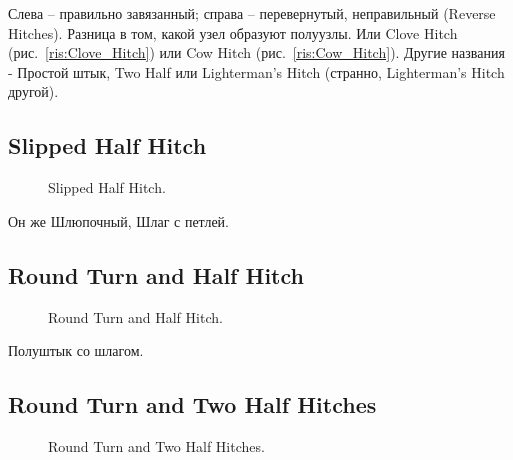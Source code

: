 Слева – правильно завязанный; справа – перевернутый, неправильный (Reverse Hitches). Разница в том, какой узел образуют полуузлы. Или Clove Hitch (рис.~\ref{ris:Clove_Hitch}) или Cow Hitch (рис.~\ref{ris:Cow_Hitch}). Другие названия - Простой штык, Two Half или Lighterman's Hitch (странно, Lighterman's Hitch другой).

\subsection{Slipped Half Hitch}

\begin{figure}[H]\centering
	\begin{minipage}{1\linewidth}
		\begin{center}
			\tcbox[enhanced jigsaw,colframe=black,opacityframe=0.5,opacityback=0.5]
			{\centering{}}
		\end{center}
	\end{minipage}
\caption{Slipped Half Hitch.}
\label{ris:Slipped_Half_Hitch}
\end{figure}

Он же Шлюпочный, Шлаг с петлей.

\subsection{Round Turn and Half Hitch}

\begin{figure}[H]\centering
	\begin{minipage}{1\linewidth}
		\begin{center}
			\tcbox[enhanced jigsaw,colframe=black,opacityframe=0.5,opacityback=0.5]
			{\centering{}}
		\end{center}
	\end{minipage}
\caption{Round Turn and Half Hitch.}
\label{ris:Round_Turn_and_Half_Hitch}
\end{figure}

Полуштык со шлагом.

\subsection{Round Turn and Two Half Hitches}

\begin{figure}[H]\centering
	\begin{minipage}{1\linewidth}
		\begin{center}
			\tcbox[enhanced jigsaw,colframe=black,opacityframe=0.5,opacityback=0.5]
			{\centering{}}
		\end{center}
	\end{minipage}
\caption{Round Turn and Two Half Hitches.}
\label{ris:Round_Turn_and_Two_Half_Hitches}
\end{figure}


